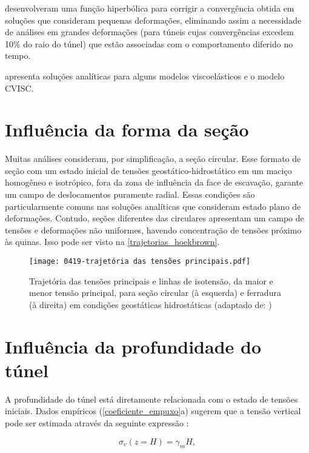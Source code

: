 \textbf{} desenvolveram uma função hiperbólica para corrigir a convergência obtida em soluções que consideram pequenas deformações, eliminando assim a necessidade de análises em grandes deformações (para túneis cujas convergências excedem 10\% do raio do túnel) que estão associadas com o comportamento diferido no tempo.

\textbf{} apresenta soluções analíticas para alguns modelos viscoelásticos e o modelo CVISC.

\section{Influência da forma da seção}

Muitas análises consideram, por simplificação, a seção circular. Esse formato de seção com um estado inicial de tensões geostático-hidrostático em um maciço homogêneo e isotrópico, fora da zona de influência da face de escavação, garante um campo de deslocamentos puramente radial. Essas condições são particularmente comuns nas soluções analíticas que consideram estado plano de deformações. Contudo, seções diferentes das circulares apresentam um campo de tensões e deformações não uniformes, havendo concentração de tensões próximo às quinas. Isso pode ser visto na \autoref{trajetorias_hoekbrown}.

\begin{figure}[H]
	\begin{center}
		\texttt{[image: 0419-trajetória das tensões principais.pdf]}
	\end{center}
	\caption{\label{trajetorias_hoekbrown}Trajetória das tensões principais e linhas de isotensão, da maior e menor tensão principal, para seção circular (à esquerda) e ferradura (à direita) em condições geostáticas hidrostáticas (adaptado de: )}
\end{figure}

\section{Influência da profundidade do túnel}
\label{cap:Influência da profundidade do túnel}
A profundidade do túnel está diretamente relacionada com o estado de tensões iniciais. Dados empíricos (\autoref{coeficiente_empuxo}a) sugerem que a tensão vertical pode ser estimada através da seguinte expressão \cite[p. 96]{Hoek1980}:

\begin{equation}
	\sigma_v(z=H)= \gamma_m H ,
\end{equation}

